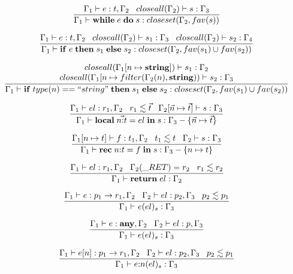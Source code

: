 \[
\dfrac{\Gamma_{1} \vdash e:t, \Gamma_{2} \;\;\;
       closeall(\Gamma_{2}) \vdash s:\Gamma_{3}}
      {\Gamma_{1} \vdash \mathbf{while} \; e \; \mathbf{do} \; s:closeset(\Gamma_{2}, fav(s))}
\]

\[
\dfrac{\Gamma_{1} \vdash e:t, \Gamma_{2} \;\;\;
       closeall(\Gamma_{2}) \vdash s_{1}:\Gamma_{3} \;\;\;
       closeall(\Gamma_{2}) \vdash s_{2}:\Gamma_{4}}
      {\Gamma_{1} \vdash \mathbf{if} \; e \; \mathbf{then} \; s_{1} \; \mathbf{else} \; s_{2}:closeset(\Gamma_{2}, fav(s_{1}) \cup fav(s_{2}))}
\]

\[
\dfrac{\begin{array}{c}
       closeall(\Gamma_{1}[n \mapsto \mathbf{string}]) \vdash s_{1}:\Gamma_{2} \\
       closeall(\Gamma_{1}[n \mapsto filter(\Gamma_{2}(n), \mathbf{string})) \vdash s_{2}:\Gamma_{3}
      \end{array}}
      {\Gamma_{1} \vdash \mathbf{if} \; type(n) == ``string" \; \mathbf{then} \; s_{1} \; \mathbf{else} \; s_{2}:closeset(\Gamma_{2}, fav(s_{1}) \cup fav(s_{2}))}
\]

\[
\dfrac{\Gamma_{1} \vdash el:r_{1}, \Gamma_{2} \;\;\;
       r_{1} \lesssim \vec{t} \;\;\;
       \Gamma_{2}[\vec{n} \mapsto \vec{t}] \vdash s:\Gamma_{3}}
      {\Gamma_{1} \vdash \mathbf{local} \; \vec{n{:}t} = el \; \mathbf{in} \; s:\Gamma_{3} - \{\vec{n} \mapsto \vec{t}\}}
\]

\[
\dfrac{\Gamma_{1}[n \mapsto t] \vdash f:t_{1}, \Gamma_{2} \;\;\;
       t_{1} \lesssim t \;\;\;
       \Gamma_{2} \vdash s:\Gamma_{3}}
      {\Gamma_{1} \vdash \mathbf{rec} \; n{:}t = f \; \mathbf{in} \; s:\Gamma_{3} - \{n \mapsto t\}}
\]

\[
\dfrac{\env_{1} \vdash el:r_{1}, \env_{2} \;\;\;
       \env_{2}(\ret) = r_{2} \;\;\;
       r_{1} \lesssim r_{2}}
      {\env_{1} \vdash \mathbf{return} \; el:\env_{2}}
\]

\[
\dfrac{\Gamma_{1} \vdash e:p_{1} \rightarrow r_{1}, \Gamma_{2} \;\;\;
       \Gamma_{2} \vdash el:p_{2}, \Gamma_{3} \;\;\;
       p_{2} \lesssim p_{1}}
      {\Gamma_{1} \vdash e(el)_{s}:\Gamma_{3}}
\]

\[
\dfrac{\Gamma_{1} \vdash e:\mathbf{any}, \Gamma_{2} \;\;\;
       \Gamma_{2} \vdash el:p, \Gamma_{3}}
      {\Gamma_{1} \vdash e(el)_{s}:\Gamma_{3}}
\]

\[
\dfrac{\Gamma_{1} \vdash e[n]:p_{1} \rightarrow r_{1}, \Gamma_{2} \;\;\;
       \Gamma_{2} \vdash el:p_{2}, \Gamma_{3} \;\;\;
       p_{2} \lesssim p_{1}}
      {\Gamma_{1} \vdash e{:}n(el)_{s}:\Gamma_{3}}
\]

